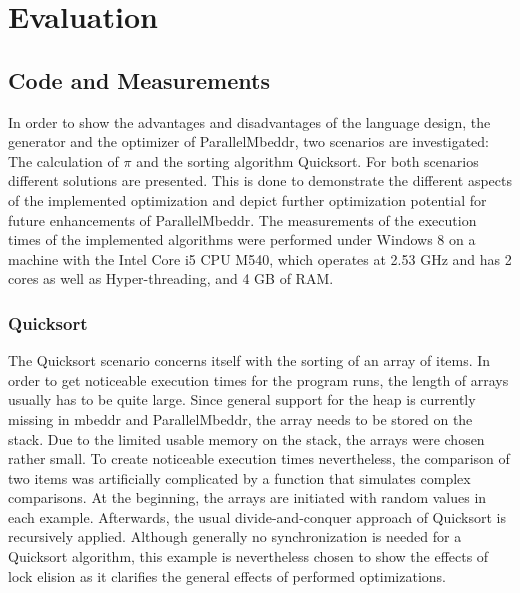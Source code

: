 \chapter{Evaluation}
\label{evaluation}
\section{Code and Measurements}
In order to show the advantages and disadvantages of the language design, the generator and the optimizer of ParallelMbeddr, two scenarios are investigated: The calculation of $\pi$ and the sorting algorithm Quicksort. For both scenarios different solutions are presented. This is done to demonstrate the different aspects of the implemented optimization and depict further optimization potential for future enhancements of ParallelMbeddr. The measurements of the execution times of the implemented algorithms were performed under Windows 8 on a machine with the Intel Core i5 CPU M540, which operates at 2.53 GHz and has 2 cores as well as Hyper-threading, and 4 GB of RAM.

\subsection{Quicksort}
The Quicksort scenario concerns itself with the sorting of an array of items. In order to get noticeable execution times for the program runs, the length of arrays usually has to be quite large. Since general support for the heap is currently missing in mbeddr and ParallelMbeddr, the array needs to be stored on the stack. Due to the limited usable memory on the stack, the arrays were chosen rather small. To create noticeable execution times nevertheless, the comparison of two items was artificially complicated by a function  that simulates complex comparisons. At the beginning, the arrays are initiated with random values in each example. Afterwards, the usual divide-and-conquer approach of Quicksort is recursively applied. Although generally no synchronization is needed for a Quicksort algorithm, this example is nevertheless chosen to show the effects of lock elision as it clarifies the general effects of performed optimizations.
